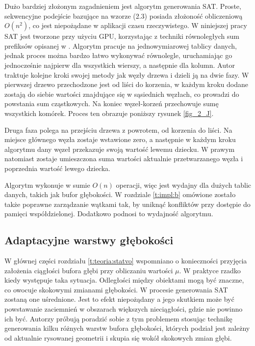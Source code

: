 		Dużo bardziej złożonym zagadnieniem jest algorytm generowania SAT. Proste, sekwencyjne podejście bazujące na wzorze (2.3) posiada złożoność obliczeniową \(O(n^2)\), co jest niepożądane w aplikacji czasu rzeczywistego. W niniejszej pracy SAT jest tworzone przy użyciu GPU, korzystając z techniki równoległych sum prefiksów opisanej w \cite{prefix-sum}. Algorytm pracuje na jednowymiarowej tablicy danych, jednak proces można bardzo łatwo wykonywać równolegle, uruchamiając go jednocześnie najpierw dla wszystkich wierszy, a następnie dla kolumn. Autor traktuje kolejne kroki swojej metody jak węzły drzewa i dzieli ją na dwie fazy. W pierwszej drzewo przechodzone jest od liści do korzenia, w każdym kroku dodane zostają do siebie wartości znajdujące się w sąsiednich węzłach, co prowadzi do powstania sum cząstkowych. Na koniec węzeł-korzeń przechowuje sumę wszystkich komórek. Proces ten obrazuje poniższy rysunek \ref{fig_2_J}.
		
		
		Druga faza polega na przejściu drzewa z powrotem, od korzenia do liści. Na miejsce głównego węzła zostaje wstawione zero, a następnie w każdym kroku algorytmu dany węzeł przekazuje swoją wartość lewemu dziecku. W prawym natomiast zostaje umieszczona suma wartości aktualnie przetwarzanego węzła i poprzednia wartość lewego dziecka.
		
		
		Algorytm wykonuje w sumie \(O(n)\) operacji, więc jest wydajny dla dużych tablic danych, takich jak bufor głębokości. W rozdziale \ref{t:impl:b} omówione zostało także poprawne zarządzanie wątkami tak, by uniknąć konfliktów przy dostępie do pamięci współdzielonej. Dodatkowo podnosi to wydajność algorytmu.
		
		\subsection{Adaptacyjne warstwy głębokości}
		\label{t:teoria:statvo:adaptive}
		
		W głównej części rozdziału \ref{t:teoria:statvo} wspomniano o konieczności przyjęcia założenia ciągłości bufora głębi przy obliczaniu wartości \(\mu\). W praktyce rzadko kiedy występuje taka sytuacja. Odległości między obiektami mogą być znaczne, co owocuje skokowymi zmianami głębokości. W procesie generowania SAT zostaną one uśrednione. Jest to efekt niepożądany a jego skutkiem może być powstawanie zaciemnień w obszarach większych nieciągłości, gdzie nie powinno ich być. Autorzy \cite{statvo} próbują poradzić sobie z tym problemem stosując technikę generowania kilku różnych warstw bufora głębokości, których podział jest zależny od aktualnie rysowanej geometrii i skupia się wokół skokowych zmian głębi.
		
